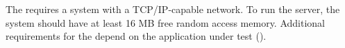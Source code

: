 The \gdagent requires a system with a TCP/IP-capable network. To run the server, the system should have at least 16 MB free random access memory. Additional requirements for the \gdagent depend on the application under test (\gdaut{}).
